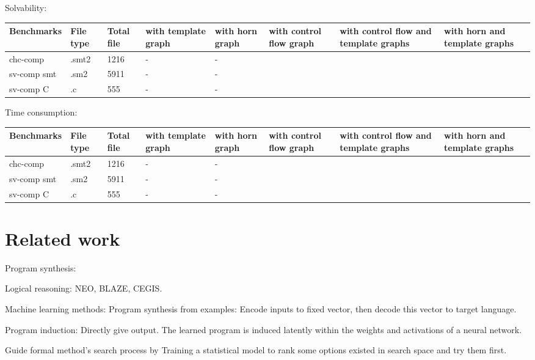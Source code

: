 \documentclass{article}
\begin{document}
Solvability:
\begin{center}
\begin{tabular}{lp{1cm}p{1cm}p{1cm}p{1cm}p{1cm}p{1cm}p{1cm} }
\hline
Benchmarks & File type & Total file & with template graph & with horn graph & with control flow graph &with control flow and template graphs & with horn and template graphs\\
\hline
chc-comp & .smt2 & 1216 & -&-\\
sv-comp smt & .sm2 & 5911 & -&-\\
sv-comp C & .c & 555 & -&-\\
\hline
\end{tabular}
\end{center}

Time consumption:
\begin{center}
\begin{tabular}{lp{1cm}p{1cm}p{1cm}p{1cm}p{1cm}p{1cm}p{1cm} }
\hline
Benchmarks & File type & Total file & with template graph & with horn graph & with control flow graph &with control flow and template graphs & with horn and template graphs\\
\hline
chc-comp & .smt2 & 1216 & -&-\\
sv-comp smt & .sm2 & 5911 & -&-\\
sv-comp C & .c & 555 & -&-\\
\hline
\end{tabular}
\end{center}

\section{Related work}
Program synthesis:

Logical reasoning: NEO, BLAZE, CEGIS.

Machine learning methods:
Program synthesis from examples:
Encode inputs to fixed vector, then decode this vector to target language.

Program induction:
Directly give output. The learned program is induced latently within the weights and activations of a neural network.

Guide formal method's search process by Training a statistical model to rank some options existed in search space and try them first.
\end{document}
